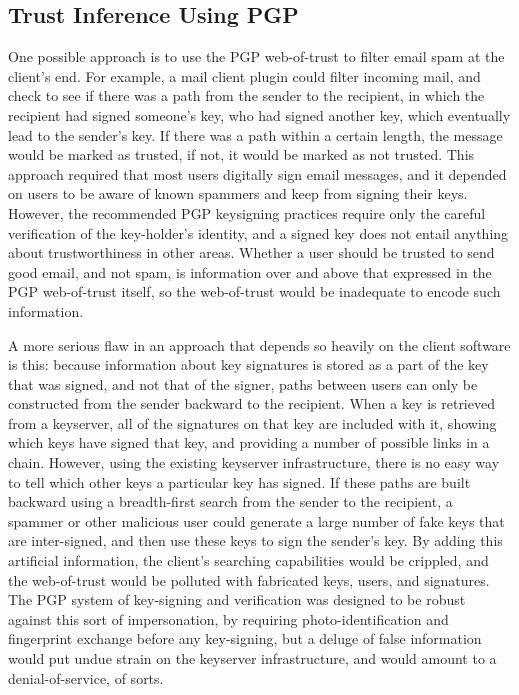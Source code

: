 \documentclass[onecolumn]{acm_proc_article-sp}
\begin{document}
\subsection{Trust Inference Using PGP}
\label{earlierPGP}
One possible approach is to use the PGP web-of-trust to filter email spam at the client's end. For example, a mail client plugin could filter incoming mail, and check to see if there was a path from the sender to the recipient, in which the recipient had signed someone's key, who had signed another key, which eventually lead to the sender's key. If there was a path within a certain length, the message would be marked as trusted, if not, it would be marked as not trusted. This approach required that most users digitally sign email messages, and it depended on users to be aware of known spammers and keep from signing their keys. However, the recommended PGP keysigning practices require only the careful verification of the key-holder's identity, and a signed key does not entail anything about trustworthiness in other areas.  Whether a user should be trusted to send good email, and not spam, is information over and above that expressed in the PGP web-of-trust itself, so the web-of-trust would be inadequate to encode such information.

A more serious flaw in an approach that depends so heavily on the client software is this:  because information about key signatures is stored as a part of the key that was signed, and not that of the signer, paths between users can only be constructed from the sender backward to the recipient. When a key is retrieved from a keyserver, all of the signatures on that key are included with it, showing which keys have signed that key, and providing a number of possible links in a chain. However, using the existing keyserver infrastructure, there is no easy way to tell which other keys a particular key has signed. If these paths are built backward using a breadth-first search from the sender to the recipient, a spammer or other malicious user could generate a large number of fake keys that are inter-signed, and then use these keys to sign the sender's key. By adding this artificial information, the client's searching capabilities would be crippled, and the web-of-trust would be polluted with fabricated keys, users, and signatures. The PGP system of key-signing and verification was designed to be robust against this sort of impersonation, by requiring photo-identification and fingerprint exchange before any key-signing, but a deluge of false information would put undue strain on the keyserver infrastructure, and would amount to a denial-of-service, of sorts.
\end{document}
